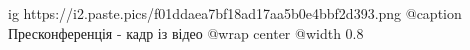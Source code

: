  
 
 
 
 

\ifcmt
  ig https://i2.paste.pics/f01ddaea7bf18ad17aa5b0e4bbf2d393.png
	@caption Пресконференція - кадр із відео
  @wrap center
  @width 0.8
\fi
